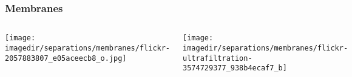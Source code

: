 







\begin{frame}\frametitle{Membranes}
	\begin{columns}[c]
			\begin{center}
				\texttt{[image: \\imagedir/separations/membranes/flickr-2057883807\_e05aceecb8\_o.jpg]}
			\end{center}
			\begin{center}
				\texttt{[image: \\imagedir/separations/membranes/flickr-ultrafiltration-3574729377\_938b4ecaf7\_b]}
			\end{center}
	\end{columns}
\end{frame}

